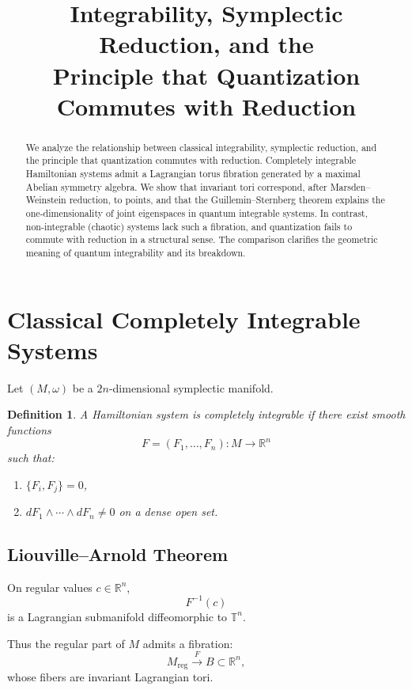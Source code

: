 \documentclass[11pt]{article}
\title{Integrability, Symplectic Reduction, and the\\
Principle that Quantization Commutes with Reduction}
\author{}
\date{}
\newtheorem{definition}{Definition}
\begin{document}
\maketitle

\begin{abstract}
We analyze the relationship between classical integrability, symplectic reduction, and the principle that quantization commutes with reduction. 
Completely integrable Hamiltonian systems admit a Lagrangian torus fibration generated by a maximal Abelian symmetry algebra. 
We show that invariant tori correspond, after Marsden--Weinstein reduction, to points, and that the Guillemin--Sternberg theorem explains the one-dimensionality of joint eigenspaces in quantum integrable systems. 
In contrast, non-integrable (chaotic) systems lack such a fibration, and quantization fails to commute with reduction in a structural sense. 
The comparison clarifies the geometric meaning of quantum integrability and its breakdown.
\end{abstract}

\tableofcontents

\section{Classical Completely Integrable Systems}

Let $(M,\omega)$ be a $2n$-dimensional symplectic manifold.

\begin{definition}
A Hamiltonian system is \emph{completely integrable} if there exist smooth functions
\[
F = (F_1,\dots,F_n): M \to \mathbb{R}^n
\]
such that:
\begin{enumerate}[label=(\roman*)]
\item $\{F_i,F_j\}=0$,
\item $dF_1 \wedge \cdots \wedge dF_n \neq 0$ on a dense open set.
\end{enumerate}
\end{definition}

\subsection{Liouville--Arnold Theorem}

On regular values $c \in \mathbb{R}^n$,
\[
F^{-1}(c)
\]
is a Lagrangian submanifold diffeomorphic to $\mathbb{T}^n$.

Thus the regular part of $M$ admits a fibration:
\[
M_{\mathrm{reg}} \xrightarrow{F} B \subset \mathbb{R}^n,
\]
whose fibers are invariant Lagrangian tori.
\end{document}
